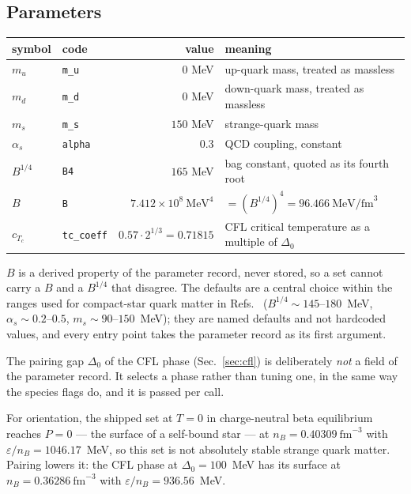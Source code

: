 \documentclass[aps,prc,onecolumn,superscriptaddress,nofootinbib,10pt]{revtex4-2}
\newcommand{\nB}{n_B}
\newcommand{\as}{\alpha_s}
\begin{document}
\subsection{Parameters}

\begin{center}
\begin{tabular}{llrl}
\toprule
symbol & code & value & meaning \\
\midrule
$m_u$      & \texttt{m\_u}   & $0$ MeV      & up-quark mass, treated as massless \\
$m_d$      & \texttt{m\_d}   & $0$ MeV      & down-quark mass, treated as massless \\
$m_s$      & \texttt{m\_s}   & $150$ MeV    & strange-quark mass \\
$\as$      & \texttt{alpha}  & $0.3$        & QCD coupling, constant \\
$B^{1/4}$  & \texttt{B4}     & $165$ MeV    & bag constant, quoted as its fourth root \\
$B$        & \texttt{B}      & $7.412\times 10^{8}\ \mathrm{MeV}^4$
                                            & $= (B^{1/4})^4 = 96.466\ \mathrm{MeV/fm}^3$ \\
$c_{T_c}$  & \texttt{tc\_coeff} & $0.57 \cdot 2^{1/3} = 0.71815$
                                            & CFL critical temperature as a multiple of $\Delta_0$ \\
\bottomrule
\end{tabular}
\end{center}
%
$B$ is a derived property of the parameter record, never stored, so a set
cannot carry a $B$ and a $B^{1/4}$ that disagree. The defaults are a central
choice within the ranges used for compact-star quark matter in
Refs.~\cite{AlfordReddy2003,Fischer2011}
($B^{1/4} \sim 145$--$180$~MeV, $\as \sim 0.2$--$0.5$,
$m_s \sim 90$--$150$~MeV); they are named defaults and not hardcoded values,
and every entry point takes the parameter record as its first argument.

The pairing gap $\Delta_0$ of the CFL phase (Sec.~\ref{sec:cfl}) is
deliberately \emph{not} a field of the parameter record. It selects a phase
rather than tuning one, in the same way the species flags do, and it is passed
per call.

For orientation, the shipped set at $T = 0$ in charge-neutral beta equilibrium
reaches $P = 0$ --- the surface of a self-bound star --- at
$\nB = 0.40309\ \mathrm{fm}^{-3}$ with $\varepsilon/\nB = 1046.17$~MeV, so
this set is not absolutely stable strange quark matter. Pairing lowers it:
the CFL phase at $\Delta_0 = 100$~MeV has its surface at
$\nB = 0.36286\ \mathrm{fm}^{-3}$ with $\varepsilon/\nB = 936.56$~MeV.
\end{document}

